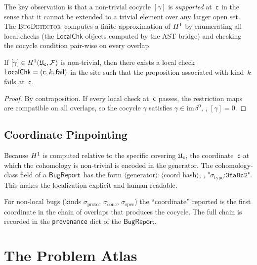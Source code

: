 \documentclass[11pt]{article}
\newcommand{\BugRep}{\ensuremath{\mathsf{BugReport}}}          %
\newcommand{\BugDet}{\textsc{BugDetector}}        %
\newcommand{\LocalChk}{\ensuremath{\mathsf{LocalChk}}}         %
\newcommand{\bugproto}{\sigma_{\mathrm{proto}}}   %
\newcommand{\bugconc}{\sigma_{\mathrm{conc}}}     %
\newcommand{\bugspec}{\sigma_{\mathrm{spec}}}     %
\begin{document}
The key observation is that a non-trivial cocycle $[\gamma]$ is
\emph{supported} at~$\mathsf{c}$ in the sense that it cannot be extended to a
trivial element over any larger open set.  The \BugDet\ computes a finite
approximation of $H^{1}$ by enumerating all local checks (the
$\LocalChk$ objects computed by the AST bridge) and checking the cocycle
condition pair-wise on every overlap.

\begin{lemma}\label{lem:support}
If $[\gamma] \in H^{1}(\mathfrak{U}_{\mathsf{c}}, \mathcal{F})$ is
non-trivial, then there exists a local check
$\LocalChk = (\coord, k, \mathsf{fail})$ in the site such that the
proposition associated with kind~$k$ fails at~$\mathsf{c}$.
\end{lemma}

\begin{proof}
By contraposition.  If every local check at~$\mathsf{c}$ passes, the
restriction maps are compatible on all overlaps, so the cocycle
$\gamma$ satisfies $\gamma \in \mathrm{im}\,\delta^0$, \ie, $[\gamma] = 0$.
\end{proof}

\subsection{Coordinate Pinpointing}

Because $H^{1}$ is computed relative to the specific covering
$\mathfrak{U}_{\mathsf{c}}$, the coordinate~$\mathsf{c}$ at which the cohomology
is non-trivial is encoded in the generator.  The cohomology-class field of
a \BugRep\ has the form
$\langle\text{generator}\rangle:\langle\text{coord\_hash}\rangle$, \eg,
$\texttt{"}\sigma_{\mathrm{type}}\texttt{:3fa8c2"}$.  This makes the
localization explicit and human-readable.

\begin{remark}
For non-local bugs (kinds $\bugproto$, $\bugconc$, $\bugspec$) the
``coordinate'' reported is the first coordinate in the chain of overlaps
that produces the cocycle.  The full chain is recorded in the
\texttt{provenance} dict of the \BugRep.
\end{remark}

\section{The Problem Atlas}\label{sec:atlas}
\end{document}
